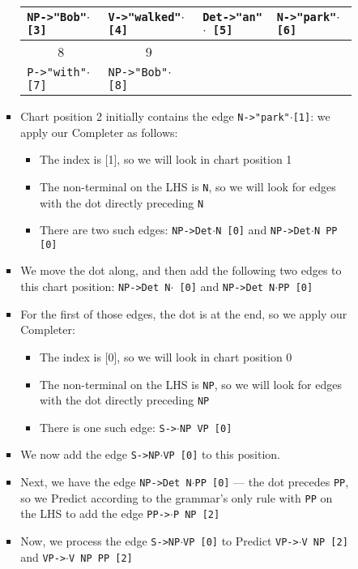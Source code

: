 \documentclass[a4paper]{article}
\begin{document}
\begin{enumerate}
\begin{enumerate}
\begin{enumerate}
\begin{itemize}
\begin{table}[hp]
\begin{tabular}{l|l|l|l}
\hline
\texttt{NP->"Bob"}$\cdot$\texttt{ [3]} & \texttt{V->"walked"}$\cdot$\texttt{ [4]} & \texttt{Det->"an"}$\cdot$\texttt{ [5]} & \texttt{N->"park"}$\cdot$\texttt{ [6]} \\
\hline
\multicolumn{1}{c}{8} & \multicolumn{1}{c}{9} & \multicolumn{1}{c}{} & \\
\hline
\texttt{P->"with"}$\cdot$\texttt{ [7]} & \texttt{NP->"Bob"}$\cdot$\texttt{ [8]} & & \\
\hline
\end{tabular}
\end{table}
\item Chart position 2 initially contains the edge \texttt{N->"park"}$\cdot$\texttt{[1]}: we apply our Completer as follows:
\begin{itemize}
\item The index is [1], so we will look in chart position 1
\item The non-terminal on the LHS is \texttt{N}, so we will look for edges with the dot directly preceding \texttt{N}
\item There are two such edges: \texttt{NP->Det}$\cdot$\texttt{N [0]} and \texttt{NP->Det}$\cdot$\texttt{N PP [0]}
\end{itemize}
\item We move the dot along, and then add the following two edges to this chart position: \texttt{NP->Det N}$\cdot$\texttt{ [0]} and \texttt{NP->Det N}$\cdot$\texttt{PP [0]}
\item For the first of those edges, the dot is at the end, so we apply our Completer:
\begin{itemize}
\item The index is [0], so we will look in chart position 0
\item The non-terminal on the LHS is \texttt{NP}, so we will look for edges with the dot directly preceding \texttt{NP}
\item There is one such edge: \texttt{S->}$\cdot$\texttt{NP VP [0]}
\end{itemize}
\item We now add the edge \texttt{S->NP}$\cdot$\texttt{VP [0]} to this position.
\item Next, we have the edge \texttt{NP->Det N}$\cdot$\texttt{PP [0]} --- the dot precedes \texttt{PP}, so we Predict according to the grammar's only rule with \texttt{PP} on the LHS to add the edge \texttt{PP->}$\cdot$\texttt{P NP [2]}
\item Now, we process the edge \texttt{S->NP}$\cdot$\texttt{VP [0]} to Predict \texttt{VP->}$\cdot$\texttt{V NP [2]} and \texttt{VP->}$\cdot$\texttt{V NP PP [2]}

\end{itemize}
\end{enumerate}
\end{enumerate}
\end{enumerate}
\end{document}
